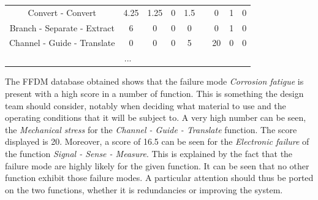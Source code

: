 \begin{table}[t]
\begin{tabular}{|c|c|c|c|c|l|c|c|c|}
Convert - Convert           & 4.25                                                           & 1.25                                                                   & 0                                                              & 1.5                                                       &                      & 0      & 1   & 0 \\ \cline{1-5} \cline{7-9} 
Branch - Separate - Extract & 6                                                           & 0                                                                   & 0                                                              & 0                                                       &                      & 0      & 1   & 0 \\ \cline{1-5} \cline{7-9} 
Channel - Guide - Translate & 0                                                           & 0                                                                   & 0                                                              & 5                                                       &                      & 20      & 0   & 0 \\ \cline{1-5} \cline{7-9}
\multicolumn{9}{|c|}{...}                                                                                                                                                                                                                                                                                                    \\ \hline
\end{tabular}
\end{table}

The FFDM database obtained shows that the failure mode \textit{Corrosion fatigue} is present with a high score in a number of function. This is something the design team should consider, notably when deciding what material to use and the operating conditions that it will be subject to. A very high number can be seen, the \textit{Mechanical stress} for the \textit{Channel - Guide - Translate} function. The score displayed is 20. Moreover, a score of 16.5 can be seen for the \textit{Electronic failure} of the function \textit{Signal - Sense - Measure}. This is explained by the fact that the failure mode are highly likely for the given function. It can be seen that no other function exhibit those failure modes. A particular attention should thus be ported on the two functions, whether it is redundancies or improving the system.

